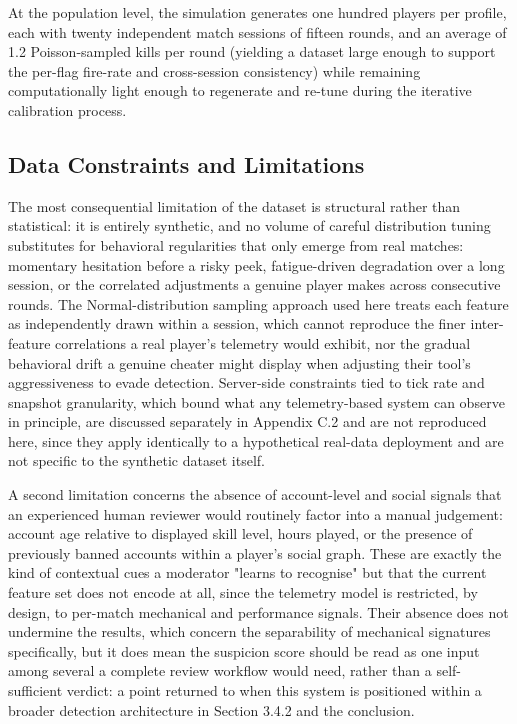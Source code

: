 At the population level, the simulation generates one hundred players per profile, each with twenty independent match sessions of fifteen rounds, and an average of 1.2 Poisson-sampled kills per round (yielding a dataset large enough to support the per-flag fire-rate and cross-session consistency) while remaining computationally light enough to regenerate and re-tune during the iterative calibration process.

\subsection{Data Constraints and Limitations}
\label{sec:three:two:three}

The most consequential limitation of the dataset is structural rather than statistical: it is entirely synthetic, and no volume of careful distribution tuning substitutes for behavioral regularities that only emerge from real matches: momentary hesitation before a risky peek, fatigue-driven degradation over a long session, or the correlated adjustments a genuine player makes across consecutive rounds. The Normal-distribution sampling approach used here treats each feature as independently drawn within a session, which cannot reproduce the finer inter-feature correlations a real player's telemetry would exhibit, nor the gradual behavioral drift a genuine cheater might display when adjusting their tool's aggressiveness to evade detection. Server-side constraints tied to tick rate and snapshot granularity, which bound what any telemetry-based system can observe in principle, are discussed separately in Appendix C.2 and are not reproduced here, since they apply identically to a hypothetical real-data deployment and are not specific to the synthetic dataset itself.

A second limitation concerns the absence of account-level and social signals that an experienced human reviewer would routinely factor into a manual judgement: account age relative to displayed skill level, hours played, or the presence of previously banned accounts within a player's social graph. These are exactly the kind of contextual cues a moderator "learns to recognise" but that the current feature set does not encode at all, since the telemetry model is restricted, by design, to per-match mechanical and performance signals. Their absence does not undermine the results, which concern the separability of mechanical signatures specifically, but it does mean the suspicion score should be read as one input among several a complete review workflow would need, rather than a self-sufficient verdict: a point returned to when this system is positioned within a broader detection architecture in Section 3.4.2 and the conclusion.

